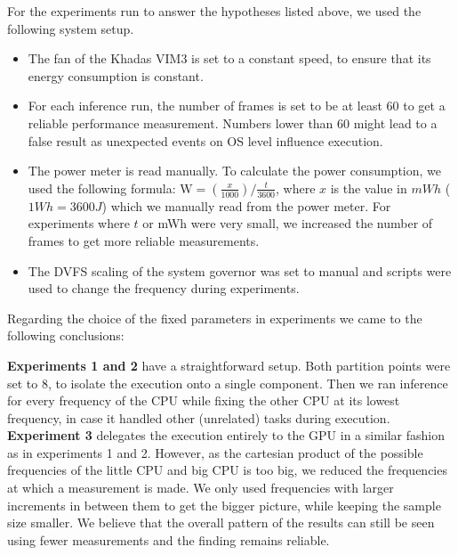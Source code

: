 \documentclass{uva-inf-article}
\begin{document}


For the experiments run to answer the hypotheses listed above, we used the following system setup. 

\begin{itemize}
    \item The fan of the Khadas VIM3 is set to a constant speed, to ensure that its energy consumption is constant.
    \item For each inference run, the number of frames is set to be at least 60 to get a reliable performance measurement. Numbers lower than 60 might lead to a false result as unexpected events on OS level influence execution.
    \item The power meter is read manually. To calculate the power consumption, we used the following formula:
    $ \text{W} = (\frac{x}{1000} ) / \frac{t}{3600}  $, where $x$ is the value in $mWh$ ($1 Wh = 3600 J$) which we manually read from the power meter.
    For experiments where $t$ or mWh were very small, we increased the number of frames to get more reliable measurements.
    \item The DVFS scaling of the system governor was set to manual and scripts were used to change the frequency during experiments.
    
\end{itemize}


Regarding the choice of the fixed parameters in experiments we came to the following conclusions:

\textbf{Experiments 1 and 2} have a straightforward setup. Both partition points were set to 8, to isolate the execution onto a single component. Then we ran inference for every frequency of the CPU while fixing the other CPU at its lowest frequency, in case it handled other (unrelated) tasks during execution. \\

\textbf{Experiment 3} delegates the execution entirely to the GPU in a similar fashion as in experiments 1 and 2. 
However, as the cartesian product of the possible frequencies of the little CPU and big CPU is too big, we reduced the frequencies at which a measurement is made. We only used frequencies with larger increments in between them to get the bigger picture, while keeping the sample size smaller. We believe that the overall pattern of the results can still be seen using fewer measurements and the finding remains reliable. \\
\end{document}
